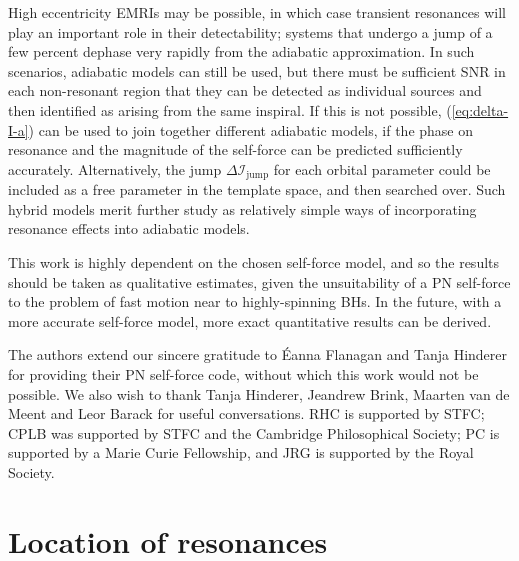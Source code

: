\documentclass[aps,prd,amsfonts,amssymb,amsmath,nofootinbib,showpacs,superscriptaddress,twocolumn]{revtex4}
\newcommand{\eqnref}[1]{(\ref{eq:#1})}
\begin{document}
High eccentricity EMRIs may be possible, in which case transient resonances will play an important role in their detectability; systems that undergo a jump of a few percent dephase very rapidly from the adiabatic approximation. In such scenarios, adiabatic models can still be used, but there must be sufficient SNR in each non-resonant region that they can be detected as individual sources and then identified as arising from the same inspiral. If this is not possible, \eqnref{delta-I-a} can be used to join together different adiabatic models, if the phase on resonance and the magnitude of the self-force can be predicted sufficiently accurately. Alternatively, the jump $\Delta\mathcal{I}_\mathrm{jump}$ for each orbital parameter could be included as a free parameter in the template space, and then searched over. Such hybrid models merit further study as relatively simple ways of incorporating resonance effects into adiabatic models.

This work is highly dependent on the chosen self-force model, and so the results should be taken as qualitative estimates, given the unsuitability of a PN self-force to the problem of fast motion near to highly-spinning BHs. In the future, with a more accurate self-force model, more exact quantitative results can be derived.

\begin{acknowledgments}
The authors extend our sincere gratitude to \'{E}anna Flanagan and Tanja Hinderer for providing their PN self-force code, without which this work would not be possible. We also wish to thank Tanja Hinderer, Jeandrew Brink, Maarten van de Meent and Leor Barack for useful conversations. RHC is supported by STFC; CPLB was supported by STFC and the Cambridge Philosophical Society; PC is supported by a Marie Curie Fellowship, and JRG is supported by the Royal Society.
\end{acknowledgments}

\appendix

\section{Location of resonances}\label{sec:location}
\end{document}
